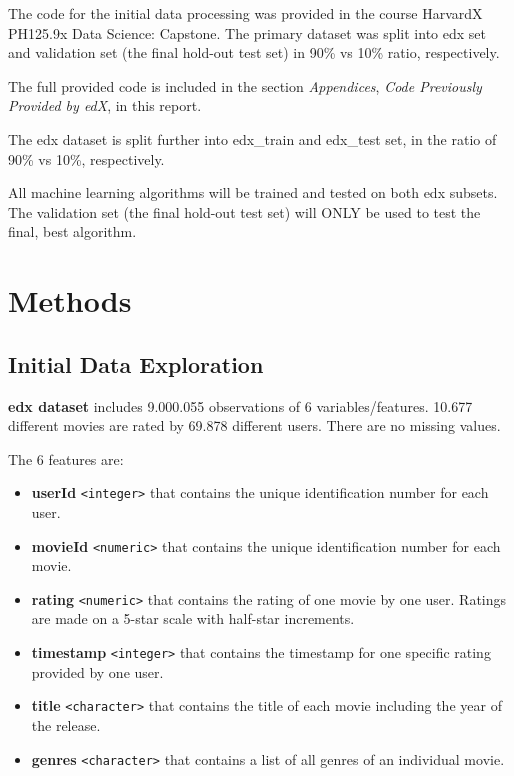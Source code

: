 \documentclass[
]{article}
\providecommand{\tightlist}{%
  \setlength{\itemsep}{0pt}\setlength{\parskip}{0pt}}
\begin{document}
The code for the initial data processing was provided in the course
HarvardX PH125.9x Data Science: Capstone. The primary dataset was split
into edx set and validation set (the final hold-out test set) in 90\% vs
10\% ratio, respectively.

The full provided code is included in the section \emph{Appendices},
\emph{Code Previously Provided by edX}, in this report.

The edx dataset is split further into edx\_train and edx\_test set, in
the ratio of 90\% vs 10\%, respectively.

All machine learning algorithms will be trained and tested on both edx
subsets. The validation set (the final hold-out test set) will ONLY be
used to test the final, best algorithm.

\newpage

\hypertarget{methods}{%
\section{Methods}\label{methods}}

\hypertarget{initial-data-exploration}{%
\subsection{Initial Data Exploration}\label{initial-data-exploration}}

\textbf{edx dataset} includes 9.000.055 observations of 6
variables/features. 10.677 different movies are rated by 69.878
different users. There are no missing values.

The 6 features are:

\begin{itemize}
\tightlist
\item
  \textbf{userId} \texttt{\textless{}integer\textgreater{}} that
  contains the unique identification number for each user.
\item
  \textbf{movieId} \texttt{\textless{}numeric\textgreater{}} that
  contains the unique identification number for each movie.
\item
  \textbf{rating} \texttt{\textless{}numeric\textgreater{}} that
  contains the rating of one movie by one user. Ratings are made on a
  5-star scale with half-star increments.
\item
  \textbf{timestamp} \texttt{\textless{}integer\textgreater{}} that
  contains the timestamp for one specific rating provided by one user.
\item
  \textbf{title} \texttt{\textless{}character\textgreater{}} that
  contains the title of each movie including the year of the release.
\item
  \textbf{genres} \texttt{\textless{}character\textgreater{}} that
  contains a list of all genres of an individual movie.
\end{itemize}
\end{document}

